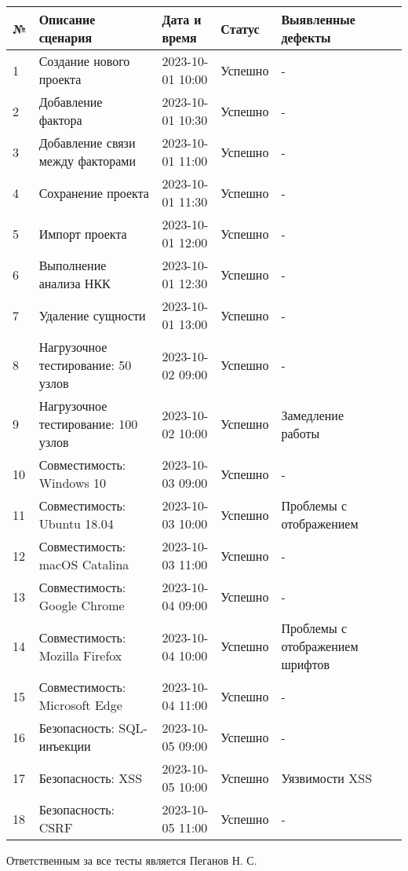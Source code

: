 \documentclass{article}
\begin{document}
\begin{itemize}
    \begin{center}
        \begin{tabular}{|l|l|l|l|l|l|}
            \hline
            № & Описание сценария & Дата и время & Статус & Выявленные дефекты \\
            \hline
            1 & Создание нового проекта & 2023-10-01 10:00 & Успешно & - \\
            \hline
            2 & Добавление фактора & 2023-10-01 10:30 & Успешно & - \\
            \hline
            3 & Добавление связи между факторами & 2023-10-01 11:00 & Успешно & - \\
            \hline
            4 & Сохранение проекта & 2023-10-01 11:30 & Успешно & - \\
            \hline
            5 & Импорт проекта & 2023-10-01 12:00 & Успешно & - \\
            \hline
            6 & Выполнение анализа НКК & 2023-10-01 12:30 & Успешно & - \\
            \hline
            7 & Удаление сущности & 2023-10-01 13:00 & Успешно & - \\
            \hline
            8 & Нагрузочное тестирование: 50 узлов & 2023-10-02 09:00 & Успешно & - \\
            \hline
            9 & Нагрузочное тестирование: 100 узлов & 2023-10-02 10:00 & Успешно & Замедление работы \\
            \hline
            10 & Совместимость: Windows 10 & 2023-10-03 09:00 & Успешно & - \\
            \hline
            11 & Совместимость: Ubuntu 18.04 & 2023-10-03 10:00 & Успешно & Проблемы с отображением \\
            \hline
            12 & Совместимость: macOS Catalina & 2023-10-03 11:00 & Успешно & - \\
            \hline
            13 & Совместимость: Google Chrome & 2023-10-04 09:00 & Успешно & - \\
            \hline
            14 & Совместимость: Mozilla Firefox & 2023-10-04 10:00 & Успешно & Проблемы с отображением шрифтов \\
            \hline
            15 & Совместимость: Microsoft Edge & 2023-10-04 11:00 & Успешно & - \\
            \hline
            16 & Безопасность: SQL-инъекции & 2023-10-05 09:00 & Успешно & - \\
            \hline
            17 & Безопасность: XSS & 2023-10-05 10:00 & Успешно & Уязвимости XSS \\
            \hline
            18 & Безопасность: CSRF & 2023-10-05 11:00 & Успешно & - \\
            \hline
        \end{tabular}
    \end{center}
    Ответственным за все тесты является Пеганов Н. С.


\end{itemize}
\end{document}
